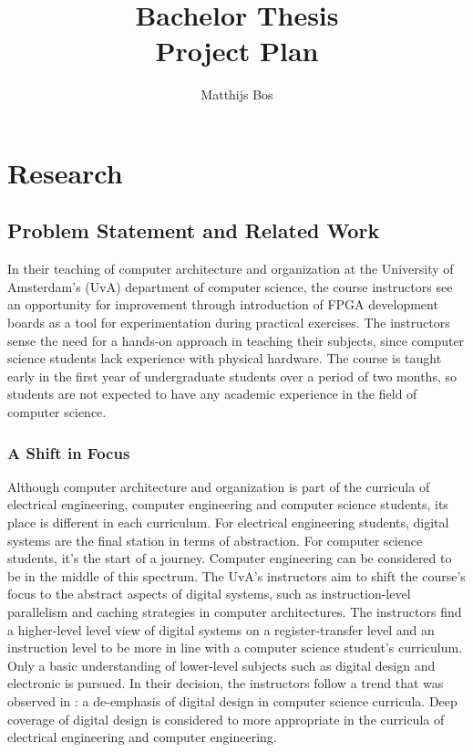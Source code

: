 \documentclass[singleside,openright]{uva-bachelor-thesis}
\title{Bachelor Thesis\\Project Plan}
\author{Matthijs Bos}
\begin{document}
\maketitle

\tableofcontents

\chapter{Research}
\section{Problem Statement and Related Work}
\label{sectionproblemstatement}


In their teaching of computer architecture and organization at the University of Amsterdam's (UvA) department of computer science, the course instructors see an opportunity for improvement through introduction of FPGA development boards as a tool for experimentation during practical exercises. The instructors sense the need for a hands-on approach in teaching their subjects, since computer science students lack experience with physical hardware. The course is taught early in the first year of undergraduate students over a period of two months, so students are not expected to have any academic experience in the field of computer science. 


\subsection{A Shift in Focus}
Although computer architecture and organization is part of the curricula of electrical engineering, computer engineering and computer science students, its place is different in each curriculum. 
For electrical engineering students, digital systems are the final station in terms of abstraction. For computer science students, it's the start of a journey. Computer engineering can be considered to be in the middle of this spectrum. The UvA's instructors aim to shift the course's focus to the abstract aspects of digital systems, such as instruction-level parallelism and caching strategies in computer architectures. The instructors find a higher-level level view of digital systems on a register-transfer level and an instruction level to be more in line with a computer science student's curriculum. Only a basic understanding of lower-level subjects such as digital design and electronic is pursued. In their decision, the instructors follow a trend that was observed in \cite[p. 205]{cs2013final}: a de-emphasis of digital design in computer science curricula. Deep coverage of digital design is considered to more appropriate in the curricula of electrical engineering and computer engineering. 
\end{document}
